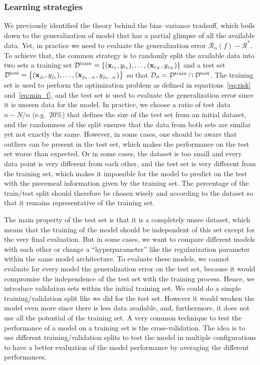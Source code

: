 \documentclass[main]{subfiles}
\begin{document}
\subsubsection{Learning strategies}

We previously identified the theory behind the bias--variance tradeoff, which boils down to the generalization of model that has a partial glimpse of all the available data. Yet, in practice we need to evaluate the generalization error $\mathcal{R}_n(f)-\mathcal{R}^*$. To achieve that, the common strategy is to randomly split the available data into two sets a training set $\mathcal{D}^{\text{train}}=\left\{{(\mathbf{x}_{i_1},y_{i_1}),\ldots,(\mathbf{x}_{i_N},y_{i_N})}\right\}$ and a test set $\mathcal{D}^{\text{test}}=\left\{(\mathbf{x}_{j_1},y_{j_1}),\ldots,(\mathbf{x}_{j_{n-N}},y_{j_{n-N}})\right\}$ so that $\mathcal{D}_n = \mathcal{D}^{\text{train}} \cap \mathcal{D}^{\text{test}}$. The training set is used to perform the optimization problem as defined in equations~\ref{eq:risk} and~\ref{eq:min_f}, and the test set is used to evaluate the generalization error since it is unseen data for the model. In practice, we choose a ratio of test data $n-N/n$ (e.g.\ {20\%}) that defines the size of the test set from an initial dataset, and the randomness of the split ensures that the data from both sets are similar yet not exactly the same. However, in some cases, one should be aware that outliers can be present in the test set, which makes the performance on the test set worse than expected. Or in some cases, the dataset is too small and every data point is very different from each other, and the test set is very different from the training set, which makes it impossible for the model to predict on the test with the piecemeal information given by the training set. The percentage of the train/test split should therefore be chosen wisely and according to the dataset so that it remains representative of the training set.

The main property of the test set is that it is a completely unsee dataset, which means that the training of the model should be independent of this set except for the very final evaluation. But in some cases, we want to compare different models with each other or change a ``hyperparameter'' like the regularization parameter within the same model architecture. To evaluate these models, we cannot evaluate for every model the generalization error on the test set, because it would compromise the independence of the test set with the training process. Hence, we introduce validation sets within the initial training set. We could do a simple training/validation split like we did for the test set. However it would weaken the model even more since there is less data available, and, furthermore, it does not use all the potential of the training set. A very common technique to test the performance of a model on a training set is the cross-validation. The idea is to use different training/validation splits to test the model in multiple configurations to have a better evaluation of the model performance by averaging the different performances. 
\end{document}
